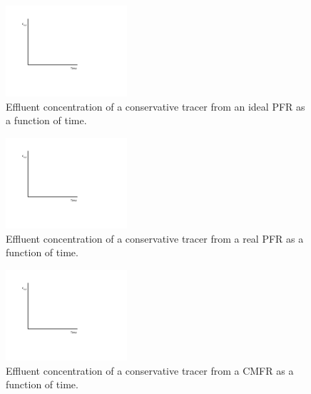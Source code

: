 \documentclass[11pt,letterpaper]{article}
\begin{document}
\begin{figure}
\centering
\includegraphics[width=0.4\textwidth]{C_out}
\caption{Effluent concentration of a conservative tracer from an ideal PFR as a function of time.}
\end{figure}

\begin{figure}
\centering
\includegraphics[width=0.4\textwidth]{C_out}
\caption{Effluent concentration of a conservative tracer from a real PFR as a function of time.}
\end{figure}

\begin{figure}
\centering
\includegraphics[width=0.4\textwidth]{C_out}
\caption{Effluent concentration of a conservative tracer from a CMFR as a function of time.}
\end{figure}
\end{document}
